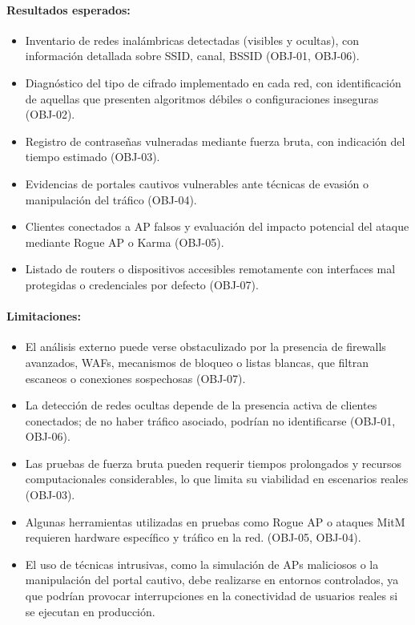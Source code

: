 \documentclass[a4paper, 10pt]{article}
\begin{document}
\paragraph{Resultados esperados:}
\begin{itemize}
    \item Inventario de redes inalámbricas detectadas (visibles y ocultas), con información detallada sobre SSID, canal, BSSID (OBJ-01, OBJ-06).
    \item Diagnóstico del tipo de cifrado implementado en cada red, con identificación de aquellas que presenten algoritmos débiles o configuraciones inseguras (OBJ-02).
    \item Registro de contraseñas vulneradas mediante fuerza bruta, con indicación del tiempo estimado (OBJ-03).
    \item Evidencias de portales cautivos vulnerables ante técnicas de evasión o manipulación del tráfico (OBJ-04).
    \item Clientes conectados a AP falsos y evaluación del impacto potencial del ataque mediante Rogue AP o Karma (OBJ-05).
    \item Listado de routers o dispositivos accesibles remotamente con interfaces mal protegidas o credenciales por defecto (OBJ-07).
\end{itemize}

\paragraph{Limitaciones:}
\begin{itemize}
    \item El análisis externo puede verse obstaculizado por la presencia de firewalls avanzados, WAFs, mecanismos de bloqueo o listas blancas, que filtran escaneos o conexiones sospechosas (OBJ-07).
    \item La detección de redes ocultas depende de la presencia activa de clientes conectados; de no haber tráfico asociado, podrían no identificarse (OBJ-01, OBJ-06).
    \item Las pruebas de fuerza bruta pueden requerir tiempos prolongados y recursos computacionales considerables, lo que limita su viabilidad en escenarios reales (OBJ-03).
    \item Algunas herramientas utilizadas en pruebas como Rogue AP o ataques MitM requieren hardware específico y tráfico en la red. (OBJ-05, OBJ-04).
    \item El uso de técnicas intrusivas, como la simulación de APs maliciosos o la manipulación del portal cautivo, debe realizarse en entornos controlados, ya que podrían provocar interrupciones en la conectividad de usuarios reales si se ejecutan en producción.
\end{itemize}
\end{document}
